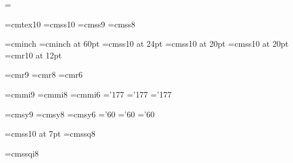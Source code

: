 \def\weavesectionsss#1#2#3#4#5{\vfill\eject\noindent{\titlefont #2}\mark{#3}\vskip 0.5in\par\noindent\titlepage}
\def\weavesectionss#1#2#3#4#5{\vfill\eject\noindent{\stitlefont #2\hfill #5}\mark{#3}\bigskip\par\noindent\titlepage}
\def\weavesections#1#2#3#4#5{\bigskip\goodbreak\noindent{\bf #4#1. #2.}\mark{#3}\quad}
\def\weavesection#1#2#3#4#5{\bigskip\goodbreak\noindent{\bf #4#1.}\mark{#3}\quad}
\def\tweavesections#1#2#3#4#5{\bigskip\goodbreak\noindent{\bf #5.#4#1. #2.}\quad}
\def\tweavesection#1#2#3#4#5{\bigskip\goodbreak\noindent{\bf #5.#4#1.}\quad}
\def\nsweavesections#1#2#3#4#5{\noindent{\bf #4#1. #2.}\mark{#3}\quad}
\def\nsweavesection#1#2#3#4#5{\noindent{\bf #4#1.}\mark{#3}\quad}

\raggedbottom

\nopagenumbers
\newif\iftitle
\def\titlepage{\global\titletrue}
\headline={\iftitle\hfil\global\titlefalse\else\tenrm\hfil{\sourcefont \firstmark\qquad\the\pageno}\fi}

\titlepage

\def\quotesource#1{\medskip{\narrower\noindent{\sourcefont #1}\par}\smallskip}
\def\cast#1#2{{#1}$\;\rightarrow\;${#2}}
\def\comp#1#2{{#1}$\;\sim\;${#2}}
\def\al{$\alpha$}
\def\be{$\beta$}
\def\nonterminal#1{$\langle${\xreffont\pdfliteral direct{1 1 0 0 k}#1\special{PDF:0 g}}$\rangle$}
\def\fixed#1{{\bf #1}}
\def\from{\par\qquad\quad$\leftarrow$\quad}
\def\continuation{\par\qquad\quad\phantom{$\leftarrow$}\quad}

\font\tentex=cmtex10
\font\sourcefont=cmss10
\font\xreffont=cmss9
\hyphenchar{}
\font\usagefont=cmss8

\font\inchhigh=cminch
\font\sinchhigh=cminch at 60pt
\font\titlefont=cmss10 at 24pt
\font\stitlefont=cmss10 at 20pt
\font\sstitlefont=cmss10 at 20pt
\font\ssstitlefont=cmr10 at 12pt

\font\ninerm=cmr9
\font\eightrm=cmr8
\font\sixrm=cmr6

\font\ninei=cmmi9
\font\eighti=cmmi8
\font\sixi=cmmi6
\skewchar\ninei='177 \skewchar\eighti='177 \skewchar\sixi='177

\font\ninesy=cmsy9
\font\eightsy=cmsy8
\font\sixsy=cmsy6
\skewchar\ninesy='60 \skewchar\eightsy='60 \skewchar\sixsy='60

\font\sevenss=cmss10 at 7pt
\font\eightss=cmssq8

\font\eightssi=cmssqi8

